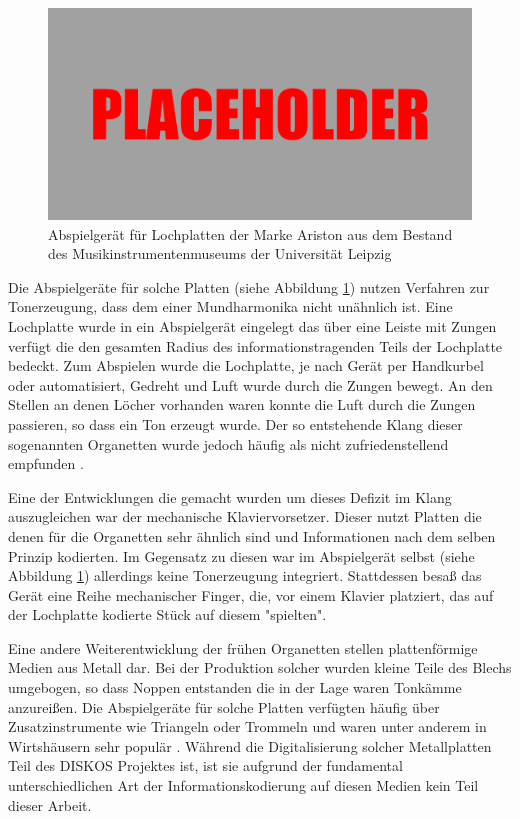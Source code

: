 \begin{figure}[t]
    \centering
    \includegraphics[width=\textwidth]{graphics/placeholder.png}
    \caption{Abspielgerät für Lochplatten der Marke Ariston aus dem Bestand des Musikinstrumentenmuseums der Universität Leipzig}
    \label{aristonplayer}
\end{figure}

Die Abspielgeräte für solche Platten (siehe Abbildung \ref{aristonplayer}) nutzen Verfahren zur Tonerzeugung, dass dem einer Mundharmonika nicht unähnlich ist.
Eine Lochplatte wurde in ein Abspielgerät eingelegt das über eine Leiste mit Zungen verfügt die den gesamten Radius des informationstragenden Teils der Lochplatte bedeckt.
Zum Abspielen wurde die Lochplatte, je nach Gerät per Handkurbel oder automatisiert, Gedreht und Luft wurde durch die Zungen bewegt.
An den Stellen an denen Löcher vorhanden waren konnte die Luft durch die Zungen passieren, so dass ein Ton erzeugt wurde.
Der so entstehende Klang dieser sogenannten Organetten wurde jedoch häufig als nicht zufriedenstellend empfunden \parencite[III.5.c. Plattenspieldosen und Drehinstrumente]{mgg_mechanische}.

Eine der Entwicklungen die gemacht wurden um dieses Defizit im Klang auszugleichen war der mechanische Klaviervorsetzer.
Dieser nutzt Platten die denen für die Organetten sehr ähnlich sind und Informationen nach dem selben Prinzip kodierten.
Im Gegensatz zu diesen war im Abspielgerät selbst (siehe Abbildung \ref{aristonplayer}) allerdings keine Tonerzeugung integriert.
Stattdessen besaß das Gerät eine Reihe mechanischer Finger, die, vor einem Klavier platziert, das auf der Lochplatte kodierte Stück auf diesem "spielten".

Eine andere Weiterentwicklung der frühen Organetten stellen plattenförmige Medien aus Metall dar.
Bei der Produktion solcher wurden kleine Teile des Blechs umgebogen, so dass Noppen entstanden die in der Lage waren Tonkämme anzureißen.
Die Abspielgeräte für solche Platten verfügten häufig über Zusatzinstrumente wie Triangeln oder Trommeln und waren unter anderem in Wirtshäusern sehr populär \parencite[III.5.c. Plattenspieldosen und Drehinstrumente]{mgg_mechanische}.
Während die Digitalisierung solcher Metallplatten Teil des DISKOS Projektes ist, ist sie aufgrund der fundamental unterschiedlichen Art der Informationskodierung auf diesen Medien kein Teil dieser Arbeit.

